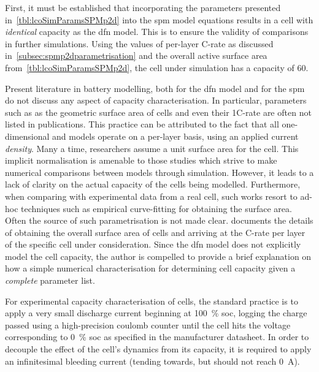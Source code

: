 First,  it  must be  established  that  incorporating the  parameters  presented
in~\cref{tbl:lcoSimParamsSPMp2d} into the \gls{spm} model equations results in a
cell with  \emph{identical} capacity as the  \gls{dfn} model. This is  to ensure
the  validity  of  comparisons  in  further simulations.  Using  the  values  of
per-layer  C-rate as  discussed  in~\cref{subsec:spmp2dparametrisation} and  the
overall active  surface area from~\cref{tbl:lcoSimParamsSPMp2d}, the  cell under
simulation has a capacity of \SI{60}{\amphour}.

Present literature  in battery modelling, both  for the \gls{dfn} model  and for
the  \gls{spm}  do not  discuss  any  aspect  of capacity  characterisation.  In
particular, parameters such  as as the geometric surface area  of cells and even
their  1C-rate are  often  not  listed in  publications.  This  practice can  be
attributed  to the  fact that  all one-dimensional  and   models
operate on  a per-layer basis, using  an applied current \emph{density}.  Many a
time,  researchers assume  a  unit  surface area  for  the  cell. This  implicit
normalisation  is amenable  to  those  studies which  strive  to make  numerical
comparisons between  models through simulation. However,  it leads to a  lack of
clarity on  the actual capacity of  the cells being modelled.  Furthermore, when
comparing with experimental  data from a real cell, such  works resort to ad-hoc
techniques such as empirical curve-fitting for obtaining the surface area. Often
the source of such parametrisation is not made clear. 
documents  the details  of  obtaining  the overall  surface  area  of cells  and
arriving at the C-rate per layer of the specific cell under consideration. Since
the \gls{dfn}  model does  not explicitly  model the  cell capacity,  the author
is  compelled  to  provide  a  brief  explanation  on  how  a  simple  numerical
characterisation for determining cell capacity given a \emph{complete} parameter
list. 

For experimental capacity characterisation of cells, the standard practice is to
apply a very small discharge  current beginning at \SI{100}{\percent} \gls{soc},
logging the charge passed using a  high-precision coulomb counter until the cell
hits the voltage corresponding to \SI{0}{\percent} \gls{soc} as specified in the
manufacturer datasheet. In  order to decouple the effect of  the cell's dynamics
from its  capacity, it is  required to  apply an infinitesimal  bleeding current
(tending towards, but should not reach \SI{0}{\ampere}).

